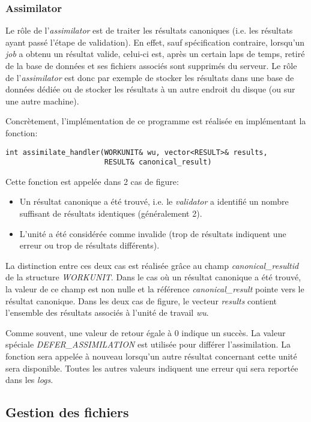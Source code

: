 \documentclass[a4paper, 11pt]{report}
\begin{document}
\subsubsection{Assimilator}
Le rôle de l'\textit{assimilator} est de traiter les résultats canoniques (i.e. les résultats ayant passé l'étape de validation). En effet, sauf spécification contraire, lorsqu'un \textit{job} a obtenu un résultat valide, celui-ci est, après un certain laps de temps, retiré de la base de données et ses fichiers associés sont supprimés du serveur. Le rôle de l'\textit{assimilator} est donc par exemple de stocker les résultats dans une base de données dédiée ou de stocker les résultats à un autre endroit du disque (ou sur une autre machine).

Concrètement, l'implémentation de ce programme est réalisée en implémentant la fonction:
\begin{verbatim}
int assimilate_handler(WORKUNIT& wu, vector<RESULT>& results, 
                       RESULT& canonical_result)
\end{verbatim}

Cette fonction est appelée dans 2 cas de figure:
\begin{itemize}
\item Un résultat canonique a été trouvé, i.e. le \textit{validator} a identifié un nombre suffisant de résultats identiques (généralement 2).
\item L'unité a été considérée comme invalide (trop de résultats indiquent une erreur ou trop de résultats différents).
\end{itemize}
La distinction entre ces deux cas est réalisée grâce au champ \textit{canonical\_resultid} de la structure \textit{WORKUNIT}. Dans le cas où un résultat canonique a été trouvé, la valeur de ce champ est non nulle et la référence \textit{canonical\_result} pointe vers le résultat canonique. Dans les deux cas de figure, le vecteur \textit{results} contient l'ensemble des résultats associés à l'unité de travail \textit{wu}.

Comme souvent, une valeur de retour égale à 0 indique un succès. La valeur spéciale \textit{DEFER\_ASSIMILATION} est utilisée pour différer l'assimilation. La fonction sera appelée à nouveau lorsqu'un autre résultat concernant cette unité sera disponible. Toutes les autres valeurs indiquent une erreur qui sera reportée dans les \textit{logs}.

\subsection{Gestion des fichiers}
\end{document}
